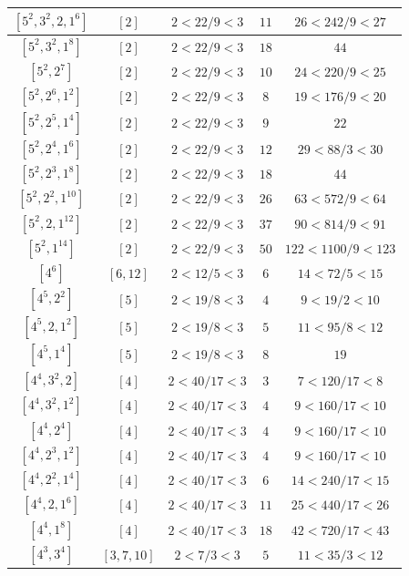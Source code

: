 \documentclass{article}%
\begin{document}
\begin{center}
\begin{longtable}{||c|c|c|c|c||}
$[5^{2}, 3^{2}, 2, 1^{6}]$ & $[2]$ & $2 < 22/9 < 3$ & $11$ & $26 < 242/9 < 27$ \\ \hline 
$[5^{2}, 3^{2}, 1^{8}]$ & $[2]$ & $2 < 22/9 < 3$ & $18$ & $44$ \\ \hline 
$[5^{2}, 2^{7}]$ & $[2]$ & $2 < 22/9 < 3$ & $10$ & $24 < 220/9 < 25$ \\ \hline 
$[5^{2}, 2^{6}, 1^{2}]$ & $[2]$ & $2 < 22/9 < 3$ & $8$ & $19 < 176/9 < 20$ \\ \hline 
$[5^{2}, 2^{5}, 1^{4}]$ & $[2]$ & $2 < 22/9 < 3$ & $9$ & $22$ \\ \hline 
$[5^{2}, 2^{4}, 1^{6}]$ & $[2]$ & $2 < 22/9 < 3$ & $12$ & $29 < 88/3 < 30$ \\ \hline 
$[5^{2}, 2^{3}, 1^{8}]$ & $[2]$ & $2 < 22/9 < 3$ & $18$ & $44$ \\ \hline 
$[5^{2}, 2^{2}, 1^{10}]$ & $[2]$ & $2 < 22/9 < 3$ & $26$ & $63 < 572/9 < 64$ \\ \hline 
$[5^{2}, 2, 1^{12}]$ & $[2]$ & $2 < 22/9 < 3$ & $37$ & $90 < 814/9 < 91$ \\ \hline 
$[5^{2}, 1^{14}]$ & $[2]$ & $2 < 22/9 < 3$ & $50$ & $122 < 1100/9 < 123$ \\ \hline 
$[4^{6}]$ & $[6, 12]$ & $2 < 12/5 < 3$ & $6$ & $14 < 72/5 < 15$ \\ \hline 
$[4^{5}, 2^{2}]$ & $[5]$ & $2 < 19/8 < 3$ & $4$ & $9 < 19/2 < 10$ \\ \hline 
$[4^{5}, 2, 1^{2}]$ & $[5]$ & $2 < 19/8 < 3$ & $5$ & $11 < 95/8 < 12$ \\ \hline 
$[4^{5}, 1^{4}]$ & $[5]$ & $2 < 19/8 < 3$ & $8$ & $19$ \\ \hline 
$[4^{4}, 3^{2}, 2]$ & $[4]$ & $2 < 40/17 < 3$ & $3$ & $7 < 120/17 < 8$ \\ \hline 
$[4^{4}, 3^{2}, 1^{2}]$ & $[4]$ & $2 < 40/17 < 3$ & $4$ & $9 < 160/17 < 10$ \\ \hline 
$[4^{4}, 2^{4}]$ & $[4]$ & $2 < 40/17 < 3$ & $4$ & $9 < 160/17 < 10$ \\ \hline 
$[4^{4}, 2^{3}, 1^{2}]$ & $[4]$ & $2 < 40/17 < 3$ & $4$ & $9 < 160/17 < 10$ \\ \hline 
$[4^{4}, 2^{2}, 1^{4}]$ & $[4]$ & $2 < 40/17 < 3$ & $6$ & $14 < 240/17 < 15$ \\ \hline 
$[4^{4}, 2, 1^{6}]$ & $[4]$ & $2 < 40/17 < 3$ & $11$ & $25 < 440/17 < 26$ \\ \hline 
$[4^{4}, 1^{8}]$ & $[4]$ & $2 < 40/17 < 3$ & $18$ & $42 < 720/17 < 43$ \\ \hline 
$[4^{3}, 3^{4}]$ & $[3, 7, 10]$ & $2 < 7/3 < 3$ & $5$ & $11 < 35/3 < 12$ \\ \hline 

\end{longtable}
\end{center}
\end{document}
